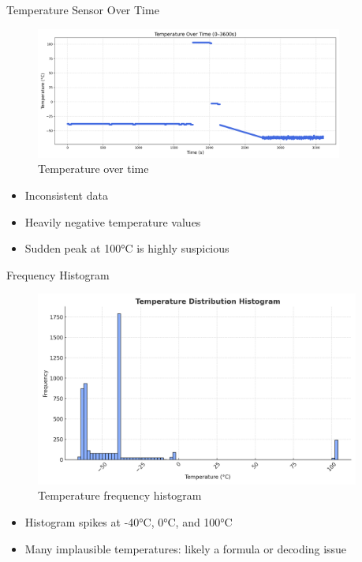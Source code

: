 \begin{frame}{Temperature Sensor Over Time}
    \begin{figure}
        \centering
        \includegraphics[height=0.5\textheight,width=0.9\textwidth,keepaspectratio]{images/temp_over_time.png}
        \caption{Temperature over time}
    \end{figure}
    \vspace{-1em}
    \begin{itemize}
        \item Inconsistent data
        \item Heavily negative temperature values
        \item Sudden peak at 100°C is highly suspicious
    \end{itemize}
\end{frame}

\begin{frame}{Frequency Histogram}
    \begin{figure}
        \centering
        \includegraphics[height=0.6\textheight,width=0.95\textwidth,keepaspectratio]{images/temp_histogram.png}
        \caption{Temperature frequency histogram}
    \end{figure}
    \vspace{-0.5em}
    \begin{itemize}
        \item Histogram spikes at  -40°C, 0°C, and 100°C
        \item Many implausible temperatures: likely a formula or decoding issue
    \end{itemize}
\end{frame}

